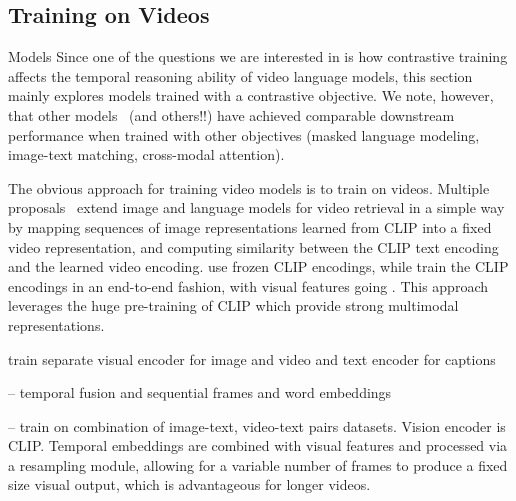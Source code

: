 



\subsection{Training on Videos}
\label{sec:vidtrain}


Models 
Since one of the questions we are interested in is how contrastive training
affects the temporal reasoning ability of video language models, this section
mainly explores models trained with a contrastive objective. We note, however,
that other models~\citep{lei2021clipbert} (and others!!) have achieved
comparable downstream performance when trained with other objectives (masked
language modeling, image-text matching, cross-modal attention).

The obvious approach for training video models is to train on videos. Multiple
proposals~\citep{portilloquintero2021clipvidret,luo2022clip4clip} extend image
and language models for video retrieval in a simple way by mapping sequences of
image representations learned from CLIP into a fixed video representation, and
computing similarity between the CLIP text encoding and the learned video
encoding. \citet{portilloquintero2021clipvidret} use frozen CLIP encodings, while
\citet{luo2022clip4clip} train the CLIP encodings in an end-to-end fashion, with
visual features going . This approach leverages the huge pre-training of
CLIP which provide strong multimodal representations.

\citet{bain2021frozen} train separate visual encoder for image and video and text encoder for captions

\cite{xu2021videoclip}

\cite{luo2022clip4clip}


\citet{lei2021clipbert} -- temporal fusion and sequential frames and word embeddings

\citet{alayrac2022flamingo} -- train on combination of image-text, video-text pairs datasets. Vision encoder is CLIP. Temporal embeddings are combined with visual features and processed via a resampling module, allowing for a variable number of frames to produce a fixed size visual output, which is advantageous for longer videos.

